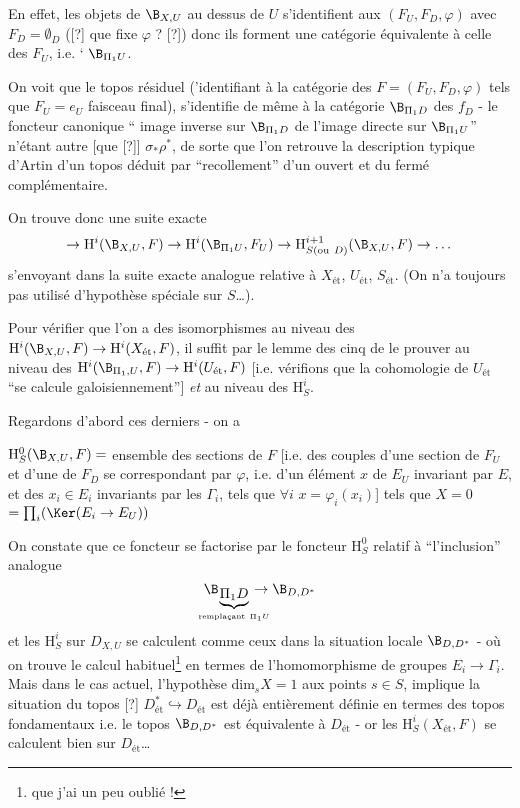 En effet, les objets de $\B_{X, U}$ au dessus de $U$ s'identifient aux $(F_U, F_D, \varphi)$ avec $F_D= \emptyset_D$ ([?] que fixe $\varphi$ ? [?]) donc ils forment une catégorie équivalente à celle des $F_U$, i.e. ` $\B_{\Pi_1 U}$.

On voit que le topos résiduel ('identifiant à la catégorie des $F = (F_U, F_D, \varphi)$ tels que $F_U = e_U$ faisceau final), s'identifie de même à la catégorie $\B_{\Pi_1 D}$ des $f_D$ - le foncteur canonique `` image inverse sur $\B_{\Pi_1 D}$ de l'image directe sur $\B_{\Pi_1 U}$'' n'étant autre [que [?]] $\sigma_* \rho^*$, de sorte que l'on retrouve la description typique d'Artin d'un topos déduit par ``recollement'' d'un ouvert et du fermé complémentaire.

On trouve donc une suite exacte
$$
\to \mathrm{H}^i(\B_{X, U}, F) \to \mathrm{H}^i(\B_{\Pi_1 U}, F_U) \to \mathrm{H}^{i+1}_{S (\text{ou}~D)}(\B_{X, U}, F) \to \dots
$$
s'envoyant dans la suite exacte analogue relative à $X_{\text{ét}}$, $U_{\text{ét}}$, $S_{\text{ét}}$. (On n'a toujours pas utilisé d'hypothèse spéciale sur $S$\dots).

Pour vérifier que l'on a des isomorphismes au niveau des $\mathrm{H}^i(\B_{X, U}, F) \to \mathrm{H}^i(X_{\text{ét}}, F)$, il suffit par le lemme des cinq de le prouver au niveau des $\mathrm{H}^i(\B_{\Pi_1, U}, F) \to \mathrm{H}^i(U_{\text{ét}}, F)$ [i.e. vérifions que la cohomologie de $U_{\text{ét}}$ ``se calcule galoisiennement''] \emph{et} au niveau des $\mathrm{H}^i_S$.

Regardons d'abord ces derniers - on a 

$\mathrm{H}^0_S (\B_{X, U}, F) =$ ensemble des sections de $F$ [i.e. des couples d'une section de $F_U$ et d'une de $F_D$ se correspondant par $\varphi$, i.e. d'un élément $x$ de $E_U$ invariant par $E$, et des $x_i \in E_i$ invariants par les $\Gamma_i$, tels que $\forall i$ $x = \varphi_i (x_i)$] tels que $X = 0$ $= \prod_i (\Ker(E_i \to E_U))$

On constate que ce foncteur se factorise par le foncteur $\mathrm{H}^0_S$ relatif à ``l'inclusion'' analogue
$$
\B_{\underbrace{\Pi_1 D}_{\hspace*{-5mm}\text{rempla\c{c}ant}~\Pi_1 U\hspace*{-5mm}}} \to \B_{D, D^*}
$$
et les $\mathrm{H}^i_S$ sur $D_{X, U}$ se calculent comme ceux dans la situation locale $\B_{D, D^*}$ - où on trouve le calcul habituel\footnote{que j'ai un peu oublié !} en termes de l'homomorphisme de groupes $E_i \to \Gamma_i$. Mais dans le cas actuel, l'hypothèse dim$_s X = 1$ aux points $s \in S$, implique la situation du topos [?] $D^*_{\text{ét}} \hookrightarrow D_{\text{ét}}$ est déjà entièrement définie en termes des topos fondamentaux i.e. le topos $\B_{D, D^*}$ est équivalente à $D_{\text{ét}}$ - or les $\mathrm{H}^i_S(X_{\text{ét}}, F)$ se calculent bien sur $D_{\text{ét}}$\dots

